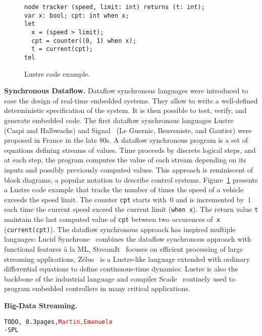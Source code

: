 \begin{figure}[!h]
\begin{lstlisting}
node tracker (speed, limit: int) returns (t: int);
var x: bool; cpt: int when x;
let
  x = (speed > limit);
  cpt = counter((0, 1) when x);
  t = current(cpt);
tel
\end{lstlisting}
\vspace*{-4mm}
\caption{\label{fig:lustre} Lustre code example.}
\end{figure}

\textbf{Synchronous Dataflow.}
Dataflow synchronous languages were introduced to ease the design of
real-time embedded systems. They allow to write a well-defined
deterministic specification of the system. It is then possible to
test, verify, and generate embedded code.
The first dataflow synchronous languages Lustre~\cite{lustre_1987}
(Caspi and Halbwachs) and Signal~\cite{signal_1991} (Le Guernic,
Benveniste, and Gautier) were proposed in France in the late 80s.
A dataflow synchronous program is a set of equations defining streams
of values. Time proceeds by discrete logical steps, and at each step,
the program computes the value of each stream depending on its inputs
and possibly previously computed values.
This approach is reminiscent of block diagrams, a popular notation to
describe control systems.
Figure~\ref{fig:lustre} presents a Lustre code example that tracks the
number of times the speed of a vehicle exceeds the speed limit. The
counter \lstinline{cpt} starts with~$0$ and is incremented by~$1$ each
time the current speed exceed the current limit (\lstinline{when x}).
The return value \lstinline{t} maintain the last computed value
of \lstinline{cpt} between two occurences of~\lstinline{x}
(\lstinline{current(cpt)}).
The dataflow synchronous approach has inspired
multiple languages: Lucid Synchrone~\cite{lucid_2006} combines the
dataflow synchronous approach with functional features \`a la ML,
StreamIt~\cite{streamit_2002} focuses on efficient processing of large
streaming applications, Z\'elus~\cite{zelus_2013} is a Lustre-like
language extended with ordinary differential equations to define
continuous-time dynamics. Lustre is also the backbone of the
industrial language and compiler Scade~\cite{scade_2017} routinely
used to program embedded controllers in many critical applications.

\textbf{Big-Data Streaming.}
\begin{alltt}TODO\scriptsize, ~0.3 pages, \textcolor{red}{Martin, Emanuele}
- SPL \cite{hirzel_schneider_gedik_2017}
\end{alltt}

